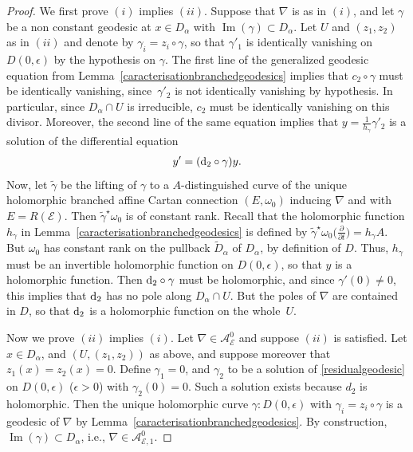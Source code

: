 \documentclass[10pt,a4paper]{amsart}
\newcommand{\der}[2]{\frac{\partial #1}{\partial#2}}
\numberwithin{equation}{section}
\begin{document}
\begin{proof}
We first prove $(i)$ implies $(ii)$. Suppose that $\nabla$ is as in $(i)$, and let $\gamma$ be a non constant geodesic at $x\in D_\alpha$ with $\operatorname{Im}(\gamma)\subset D_\alpha$. Let $U$ and $(z_1,z_2)$ as in $(ii)$ and denote by $\gamma_i = z_i \circ \gamma$, so that $\gamma'_1$ is identically vanishing on $D(0,\epsilon)$ by the hypothesis on $\gamma$. The first line of the generalized geodesic equation from Lemma~\ref{caracterisationbranchedgeodesics} implies that $c_2 \circ \gamma$ must be identically vanishing, since~$\gamma'_2$ is not identically vanishing by hypothesis. In particular, since $D_\alpha \cap U$ is irreducible, $c_2$ must be identically vanishing on this divisor.
Moreover, the second line of the same equation implies that $y=\frac{1}{h_\gamma} \gamma'_2$ is a solution of the differential equation
 \begin{gather}\label{residualgeodesic} y'= ({\rm d}_2\circ \gamma) y. \end{gather}
 Now, let $\tilde{\gamma}$ be the lifting of $\gamma$ to a $A$-distinguished curve of the unique holomorphic branched affine Cartan connection $(E,\omega_0)$ inducing $\nabla$ and with $E=R(\mathcal{E})$. Then $\tilde{\gamma}^\star \omega_0$ is of constant rank. Recall that the holomorphic function $h_\gamma$ in Lemma~\ref{caracterisationbranchedgeodesics} is defined by $\tilde{\gamma}^\star \omega_0\big(\der{}{t}\big) = h_\gamma A$. But $\omega_0$ has constant rank on the pullback $\tilde{D}_\alpha$ of $D_\alpha$, by definition of $D$. Thus, $h_\gamma$ must be an invertible holomorphic function on $D(0,\epsilon)$, so that $y$ is a holomorphic function. Then ${\rm d}_2\circ \gamma$ must be holomorphic, and since $\gamma'(0)\neq 0$, this implies that ${\rm d}_2$ has no pole along $D_\alpha \cap U$. But the poles of $\nabla$ are contained in $D$, so that ${\rm d}_2$ is a holomorphic function on the whole~$U$.

Now we prove $(ii)$ implies $(i)$. Let $\nabla \in \mathcal{A}^0_\mathcal{E}$ and suppose $(ii)$ is satisfied. Let $x \in D_\alpha$, and $(U,(z_1,z_2))$ as above, and suppose moreover that $z_1(x)=z_2(x)=0$. Define $\gamma_1 =0$, and $\gamma_2$ to be a solution of \eqref{residualgeodesic} on $D(0,\epsilon)$ ($\epsilon >0$) with $\gamma_2(0)=0$. Such a solution exists because $d_2$ is holomorphic. Then the unique holomorphic curve $\gamma\colon D(0,\epsilon)$ with $\gamma_i = z_i \circ \gamma$ is a geodesic of $\nabla$ by Lemma~\ref{caracterisationbranchedgeodesics}. By construction, $\operatorname{Im}(\gamma)\subset D_\alpha$, i.e., $\nabla\in \mathcal{A}^0_{\mathcal{E},1}$.
\end{proof}
\end{document}
